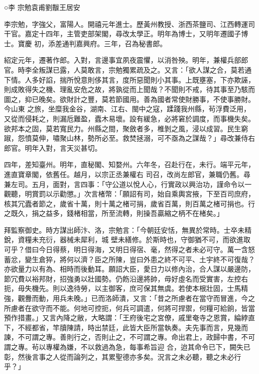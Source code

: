 
\begin{pinyinscope}

 ○李
 宗勉袁甫劉黻王居安



 李宗勉，字強父，富陽人。開禧元年進士。歷黃州教授、浙西茶鹽司、江西轉運司干官。嘉定十四年，主管吏部架閣，尋改太學正。明年為博士，又明年遷國子博士。寶慶
 初，添差通判嘉興府。三年，召為秘書郎。



 紹定元年，遷著作郎。入對，言邊事宜夙夜震懼，以消咎殃。明年，兼權兵部郎官。時李全叛謀已露，人莫敢言，宗勉獨累疏及之。又言：「欲人謀之合，莫若通下情。人多好諂，揣所悅意則侈其言，度所惡聞則小其事。上既壅塞，下亦欺誣，則成敗得失之機、理亂安危之故，將孰從而上聞哉？不聞則不戒，待其事至乃駭而圖之，抑已晚矣。欲財計之豐，莫若節國用。善為國者常使財勝事，不使事勝財。今山東
 之旅，坐糜我金谷，湖南、江右、閩中之寇，蹂踐我州縣，茍浮費泛用，又從而侵耗之，則漏卮難盈，蠹木易壞。設有緩急，必將窘於調度，而事機失矣。欲邦本之固，莫若寬民力。州縣之間，聚斂者多，椎剝之風，浸以成習。民生窮踧，怨憤莫伸，嘯聚山林，勢所必至。救焚拯溺，可不亟為之謀哉？」尋改兼侍右郎官。明年入對，言天災甚切。



 四年，差知臺州。明年，直秘閣、知婺州。六年冬，召赴行在，未行。端平元年，進直寶章閣，依舊任。越月，以宗正丞兼權右
 司召，改尚左郎官，兼職仍舊。尋兼左司。五月，面對，言四事：「守公道以悅人心，行實政以興治功，謹命令以一觀聽，明賞罰以示勸懲。」次言楮幣：「願詔有司，始自乘輿宮掖，下至百司庶府，核其冗蠹者節之，歲省十萬，則十萬之楮可捐，歲省百萬，則百萬之楮可捐也。行之既久，捐之益多，錢楮相當，所至流轉，則操吾贏縮之柄不在楮矣。」



 拜監察御史。時方謀出師汴、洛，宗勉言：「今朝廷安恬，無異於常時。士卒未精銳，資糧未充衍，器械未犀利，城
 壁未繕修。於斯時也，守御猶不可，而欲進取可乎？借曰今日得蔡，明日得海，又明日得宿、毫，然得之者未必可守。萬一含怒蓄忿，變生倉猝，將何以濟？臣之所陳，豈曰外患之終不可平、土宇終不可復哉？亦欲量力以有為、相時而後動耳。願詔大臣，愛日力以修內治，合人謀以嚴邊防，節冗費以裕邦財，招強勇以壯國勢。仍飭沿邊將帥，毋好虛名而受實害，左控右扼，毋失機先。則以逸待勞，以主御客，庶可保其無虞。若使本根壯固，士馬精
 強，觀釁而動，用兵未晚。」已而洛師潰，又言：「昔之所慮者在當守而冒進，今之所慮者在欲守而不能。何地可控扼，何兵可調遣，何將可捍禦，何糧可給餉，皆當預作措畫。」又言內降之敝，大略謂：「王府後宅之宮僚，戚里奄寺之恩賞，綸綍直下，不經都省，竿牘陳請，時出禁廷，此皆大臣所當執奏。夫先事而言，見幾而諫，不可謂之專。善則行之，否則止之，不可謂之專。命出君上，政歸中書，不可謂之專。茍以專權為嫌，不以救過為急，每事希旨迎
 合，迨其命令已下，闕失已彰，然後言事之人從而論列之，其累聖德亦多矣。況言之未必聽，聽之未必行乎？」




\end{pinyinscope}
